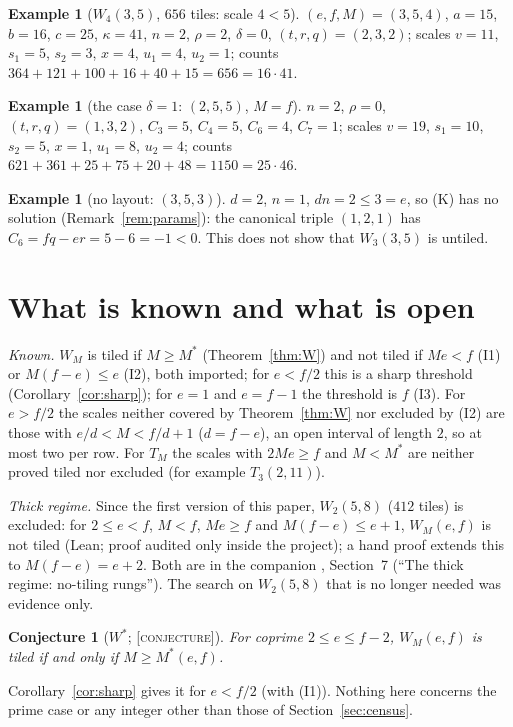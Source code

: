 \documentclass[11pt,reqno]{amsart}
\theoremstyle{plain}
\newtheorem{conjecture}[theorem]{Conjecture}
\theoremstyle{definition}
\newtheorem{example}[theorem]{Example}
\newcommand{\lab}[1]{\textup{[\textsc{#1}]}}
\newcommand{\CJ}{\lab{conjecture}}
\begin{document}
\begin{example}[$W_4(3,5)$, $656$ tiles: scale $4<5$]\label{ex:656}
$(e,f,M)=(3,5,4)$, $a=15$, $b=16$, $c=25$, $\kappa=41$, $n=2$, $\rho=2$, $\delta=0$, $(t,r,q)=(2,3,2)$; scales $v=11$, $s_1=5$, $s_2=3$, $x=4$, $u_1=4$, $u_2=1$; counts $364+121+100+16+40+15=656=16\cdot41$.
\end{example}
\begin{example}[the case $\delta=1$: $(2,5,5)$, $M=f$]\label{ex:delta}
$n=2$, $\rho=0$, $(t,r,q)=(1,3,2)$, $C_3=5$, $C_4=5$, $C_6=4$, $C_7=1$; scales $v=19$, $s_1=10$, $s_2=5$, $x=1$, $u_1=8$, $u_2=4$; counts $621+361+25+75+20+48=1150=25\cdot46$.
\end{example}
\begin{example}[no layout: $(3,5,3)$]\label{ex:fail}
$d=2$, $n=1$, $dn=2\le3=e$, so (K) has no solution (Remark~\ref{rem:params}): the canonical triple $(1,2,1)$ has $C_6=fq-er=5-6=-1<0$. This does not show that $W_3(3,5)$ is untiled.
\end{example}

\section{What is known and what is open}\label{sec:open}
\emph{Known.} $W_M$ is tiled if $M\ge M^*$ (Theorem~\ref{thm:W}) and not tiled if $Me<f$ (I1) or $M(f-e)\le e$ (I2), both imported; for $e<f/2$ this is a sharp threshold (Corollary~\ref{cor:sharp}); for $e=1$ and $e=f-1$ the threshold is $f$ (I3). For $e>f/2$ the scales neither covered by Theorem~\ref{thm:W} nor excluded by (I2) are those with $e/d<M<f/d+1$ ($d=f-e$), an open interval of length $2$, so at most two per row. For $T_M$ the scales with $2Me\ge f$ and $M<M^*$ are neither proved tiled nor excluded (for example $T_3(2,11)$).

\emph{Thick regime.} Since the first version of this paper, $W_2(5,8)$ ($412$ tiles) is excluded: for $2\le e<f$, $M<f$, $Me\ge f$ and $M(f-e)\le e+1$, $W_M(e,f)$ is not tiled (Lean; proof audited only inside the project); a hand proof extends this to $M(f-e)=e+2$. Both are in the companion \cite{Companion}, Section~7 (``The thick regime: no-tiling rungs''). The search on $W_2(5,8)$ that is no longer needed was evidence only.

\begin{conjecture}[$W^*$; \CJ{}]\label{conj:W}
For coprime $2\le e\le f-2$, $W_M(e,f)$ is tiled if and only if $M\ge M^*(e,f)$.
\end{conjecture}
Corollary~\ref{cor:sharp} gives it for $e<f/2$ (with (I1)). Nothing here concerns the prime case or any integer other than those of Section~\ref{sec:census}.
\end{document}
